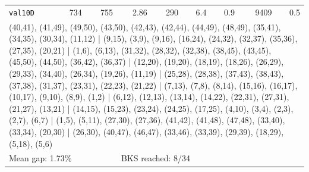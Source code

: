 \begin{landscape}
\begin{longtable}{lrrrrrrrr}
\texttt{val10D} & 734 & 755 & 2.86 & 290 & 6.4 & 0.9 & 9409 & 0.5 \\
\multicolumn{9}{p{0.96\linewidth}}{\tiny\raggedright\arraybackslash (40,41), (41,49), (49,50), (43,50), (42,43), (42,44), (44,49), (48,49), (35,41), (34,35), (30,34), (11,12) | (9,15), (3,9), (9,16), (16,24), (24,32), (32,37), (35,36), (27,35), (20,21) | (1,6), (6,13), (31,32), (28,32), (32,38), (38,45), (43,45), (45,50), (44,50), (36,42), (36,37) | (12,20), (19,20), (18,19), (18,26), (26,29), (29,33), (34,40), (26,34), (19,26), (11,19) | (25,28), (28,38), (37,43), (38,43), (37,38), (31,37), (23,31), (22,23), (21,22) | (7,13), (7,8), (8,14), (15,16), (16,17), (10,17), (9,10), (8,9), (1,2) | (6,12), (12,13), (13,14), (14,22), (22,31), (27,31), (21,27), (13,21) | (14,15), (15,23), (23,24), (24,25), (17,25), (4,10), (3,4), (2,3), (2,7), (6,7) | (1,5), (5,11), (27,30), (27,36), (41,42), (41,48), (47,48), (33,40), (33,34), (20,30) | (26,30), (40,47), (46,47), (33,46), (33,39), (29,39), (18,29), (5,18), (5,6)} \\[2pt]
\midrule
\multicolumn{3}{l}{Mean gap: 1.73\%} & \multicolumn{6}{l}{BKS reached: 8/34} \\
\end{longtable}
\endgroup
\end{landscape}
\restoregeometry